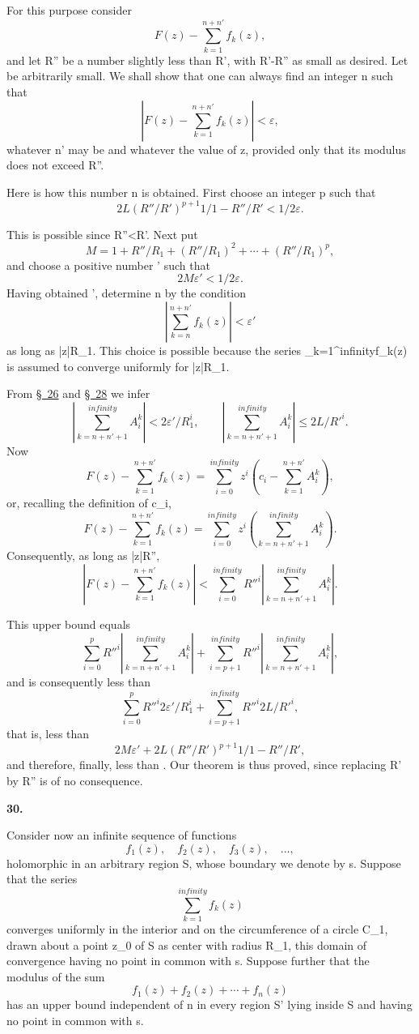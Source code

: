 \documentclass[
  paper=b5,
  fontsize=13pt,
  twoside,
  headings=normal,
  bookmarkpackage=false
]{scrartcl}
\theoremstyle{stieltjesplain}
\theoremstyle{stieltjesdefinition}
\def\({}\def\){}%
\def\frac#1#2{#1/#2}%
\def\infty{infinity}%
\newcommand{\origsection}[1]{%
  \par\addvspace{0.85\baselineskip}%
  \phantomsection\label{sec:#1}%
  \addcontentsline{toc}{subsection}{\texorpdfstring{\S~#1}{Section #1}}%
  \noindent\textbf{#1.}\quad\ignorespaces
}
\begin{document}
For this purpose consider
\[
 F(z)-\sum_{k=1}^{n+n'}f_k(z),
\]
and let \(R''\) be a number slightly less than \(R'\), with
\(R'-R''\) as small as desired. Let \(\varepsilon\) be arbitrarily small.
We shall show that one can always find an integer \(n\) such that
\[
 \left|F(z)-\sum_{k=1}^{n+n'}f_k(z)\right|<\varepsilon,
\]
whatever \(n'\) may be and whatever the value of \(z\), provided only
that its modulus does not exceed \(R''\).

Here is how this number \(n\) is obtained. First choose an integer \(p\)
such that
\[
 2L\left(\frac{R''}{R'}\right)^{p+1}
 \frac1{1-R''/R'}<\frac12\varepsilon.
\]

This is possible since \(R''<R'\). Next put
\[
 M=1+\frac{R''}{R_1}+\left(\frac{R''}{R_1}\right)^2
  +\cdots+\left(\frac{R''}{R_1}\right)^p,
\]
and choose a positive number \(\varepsilon'\) such that
\[
 2M\varepsilon'<\frac12\varepsilon.
\]
Having obtained \(\varepsilon'\), determine \(n\) by the condition
\[
 \left|\sum_{k=n}^{n+n'}f_k(z)\right|<\varepsilon'
\]
as long as \(|z|\leq R_1\). This choice is possible because the series
\(\sum_{k=1}^{\infty}f_k(z)\) is assumed to converge uniformly for
\(|z|\leq R_1\).

From \hyperref[sec:26]{\S~26} and \hyperref[sec:28]{\S~28} we infer
\[
 \left|\sum_{k=n+n'+1}^{\infty}A_i^k\right|
 <\frac{2\varepsilon'}{R_1^i},
 \qquad
 \left|\sum_{k=n+n'+1}^{\infty}A_i^k\right|
 \leq\frac{2L}{R'^i}.
\]
Now
\[
 F(z)-\sum_{k=1}^{n+n'}f_k(z)
 =\sum_{i=0}^{\infty}z^i
  \left(c_i-\sum_{k=1}^{n+n'}A_i^k\right),
\]
or, recalling the definition of \(c_i\),
\[
 F(z)-\sum_{k=1}^{n+n'}f_k(z)
 =\sum_{i=0}^{\infty}z^i
  \left(\sum_{k=n+n'+1}^{\infty}A_i^k\right).
\]
Consequently, as long as \(|z|\leq R''\),
\[
 \left|F(z)-\sum_{k=1}^{n+n'}f_k(z)\right|
 <\sum_{i=0}^{\infty}R''^i
  \left|\sum_{k=n+n'+1}^{\infty}A_i^k\right|.
\]

This upper bound equals
\[
 \sum_{i=0}^{p}R''^i
  \left|\sum_{k=n+n'+1}^{\infty}A_i^k\right|
 +\sum_{i=p+1}^{\infty}R''^i
  \left|\sum_{k=n+n'+1}^{\infty}A_i^k\right|,
\]
and is consequently less than
\[
 \sum_{i=0}^{p}R''^i\frac{2\varepsilon'}{R_1^i}
 +\sum_{i=p+1}^{\infty}R''^i\frac{2L}{R'^i},
\]
that is, less than
\[
 2M\varepsilon'
 +2L\left(\frac{R''}{R'}\right)^{p+1}
   \frac1{1-R''/R'},
\]
and therefore, finally, less than \(\varepsilon\). Our theorem is thus
proved, since replacing \(R'\) by \(R''\) is of no consequence.

\origsection{30}
Consider now an infinite sequence of functions
\[
 f_1(z),\quad f_2(z),\quad f_3(z),\quad\ldots,
\]
holomorphic in an arbitrary region \(S\), whose boundary we denote by
\(s\). Suppose that the series
\[
 \sum_{k=1}^{\infty}f_k(z)
\]
converges uniformly in the interior and on the circumference of a circle
\(C_1\), drawn about a point \(z_0\) of \(S\) as center with radius
\(R_1\), this domain of convergence having no point in common with
\(s\). Suppose further that the modulus of the sum
\[
 f_1(z)+f_2(z)+\cdots+f_n(z)
\]
has an upper bound independent of \(n\) in every region \(S'\) lying
inside \(S\) and having no point in common with \(s\).
\end{document}
